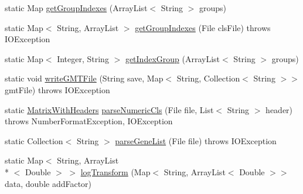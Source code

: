 \begin{DoxyCompactItemize}
\item 
static Map \hyperlink{classbroad_1_1core_1_1util_1_1_parse_g_c_t_file_a212dc63e80e3d8c1ca091b4048914a17}{get\+Group\+Indexes} (Array\+List$<$ String $>$ groups)
\item 
static Map$<$ String, Array\+List $>$ \hyperlink{classbroad_1_1core_1_1util_1_1_parse_g_c_t_file_ae00aa04ccfe221cc01da82c0223c652d}{get\+Group\+Indexes} (File cls\+File)  throws I\+O\+Exception
\item 
static Map$<$ Integer, String $>$ \hyperlink{classbroad_1_1core_1_1util_1_1_parse_g_c_t_file_a9147960feca9e43647c5691d6387709e}{get\+Index\+Group} (Array\+List$<$ String $>$ groups)
\item 
static void \hyperlink{classbroad_1_1core_1_1util_1_1_parse_g_c_t_file_ab5b4dc161599de99120018293533d358}{write\+G\+M\+T\+File} (String save, Map$<$ String, Collection$<$ String $>$$>$ gmt\+File)  throws I\+O\+Exception 
\item 
static \hyperlink{classbroad_1_1core_1_1datastructures_1_1_matrix_with_headers}{Matrix\+With\+Headers} \hyperlink{classbroad_1_1core_1_1util_1_1_parse_g_c_t_file_a67435529e7021231411c47bb8fa73b64}{parse\+Numeric\+Cls} (File file, List$<$ String $>$ header)  throws Number\+Format\+Exception, I\+O\+Exception 
\item 
static Collection$<$ String $>$ \hyperlink{classbroad_1_1core_1_1util_1_1_parse_g_c_t_file_ae1526fb4abd6792fa15213687f287c49}{parse\+Gene\+List} (File file)  throws I\+O\+Exception 
\item 
static Map$<$ String, Array\+List\\*
$<$ Double $>$ $>$ \hyperlink{classbroad_1_1core_1_1util_1_1_parse_g_c_t_file_aae0e9506d260e5b177c658c6aa5d9a7a}{log\+Transform} (Map$<$ String, Array\+List$<$ Double $>$$>$ data, double add\+Factor)
\end{DoxyCompactItemize}



